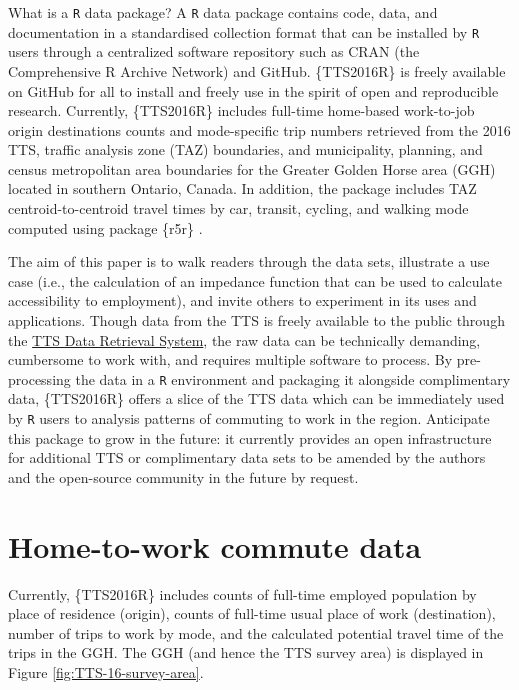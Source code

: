 \documentclass[Royal,times,sageh]{sagej}
\begin{document}
What is a \texttt{R} data package? A \texttt{R} data package contains
code, data, and documentation in a standardised collection format that
can be installed by \texttt{R} users through a centralized software
repository such as CRAN (the Comprehensive R Archive Network) and
GitHub. \{TTS2016R\} is freely available on GitHub for all to install
and freely use in the spirit of open and reproducible research.
Currently, \{TTS2016R\} includes full-time home-based work-to-job origin
destinations counts and mode-specific trip numbers retrieved from the
2016 TTS, traffic analysis zone (TAZ) boundaries, and municipality,
planning, and census metropolitan area boundaries for the Greater Golden
Horse area (GGH) located in southern Ontario, Canada. In addition, the
package includes TAZ centroid-to-centroid travel times by car, transit,
cycling, and walking mode computed using package \{r5r\}
\citep{Pereira2021r5r}.

The aim of this paper is to walk readers through the data sets,
illustrate a use case (i.e., the calculation of an impedance function
that can be used to calculate accessibility to employment), and invite
others to experiment in its uses and applications. Though data from the
TTS is freely available to the public through the
\href{https://dmg.utoronto.ca/idrs/index}{TTS Data Retrieval System},
the raw data can be technically demanding, cumbersome to work with, and
requires multiple software to process. By pre-processing the data in a
\texttt{R} environment and packaging it alongside complimentary data,
\{TTS2016R\} offers a slice of the TTS data which can be immediately
used by \texttt{R} users to analysis patterns of commuting to work in
the region. Anticipate this package to grow in the future: it currently
provides an open infrastructure for additional TTS or complimentary data
sets to be amended by the authors and the open-source community in the
future by request.

\hypertarget{home-to-work-commute-data}{%
\section{Home-to-work commute data}\label{home-to-work-commute-data}}

Currently, \{TTS2016R\} includes counts of full-time employed population
by place of residence (origin), counts of full-time usual place of work
(destination), number of trips to work by mode, and the calculated
potential travel time of the trips in the GGH. The GGH (and hence the
TTS survey area) is displayed in Figure \ref{fig:TTS-16-survey-area}.
\end{document}
